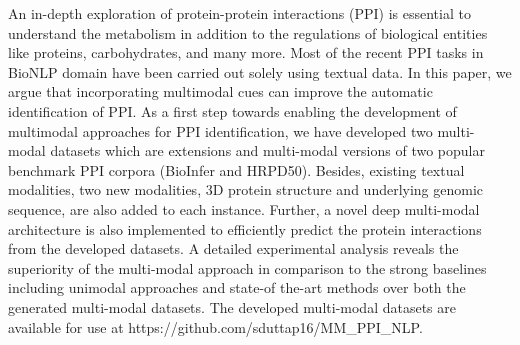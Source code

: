 An in-depth exploration of protein-protein interactions (PPI) is essential to understand the metabolism in addition to the regulations of biological entities like proteins, carbohydrates, and many more. Most of the recent PPI tasks in BioNLP domain have been carried out solely using textual data. In this paper, we argue that incorporating multimodal cues can improve the automatic identification of PPI. As a first step towards enabling the development of multimodal approaches for PPI identification, we have developed two multi-modal datasets which are extensions and multi-modal versions of two popular benchmark PPI corpora (BioInfer and HRPD50). Besides, existing textual modalities, two new modalities, 3D protein structure and underlying genomic sequence, are also added to each instance. Further, a novel deep multi-modal architecture is also implemented to efficiently predict the protein interactions from the developed datasets. A detailed experimental analysis reveals the superiority of the multi-modal approach in comparison to the strong baselines including unimodal approaches and state-of the-art methods over both the generated multi-modal datasets. The developed multi-modal datasets are available for use at https://github.com/sduttap16/MM\_PPI\_NLP.
